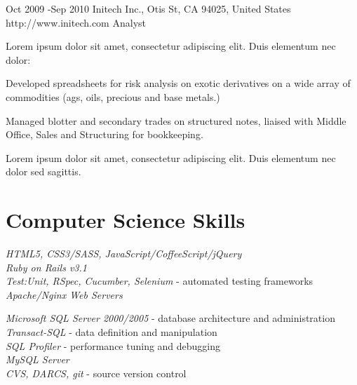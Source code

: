 \documentclass[10pt]{article} %
\begin{document}
\job
{Oct 2009 -}{Sep 2010}
{Initech Inc., Otis St, CA 94025, United States}
{http://www.initech.com}
{Analyst}
{Lorem ipsum dolor sit amet, consectetur adipiscing elit. Duis elementum nec dolor:

\begin{itemize-noindent}
\item{Developed spreadsheets for risk analysis on exotic derivatives on a wide array of commodities (ags, oils, precious and base metals.)}
\item{Managed blotter and secondary trades on structured notes, liaised with Middle Office, Sales and Structuring for bookkeeping.}
\end{itemize-noindent}

Lorem ipsum dolor sit amet, consectetur adipiscing elit. Duis elementum nec dolor sed sagittis.}


\section{Computer Science Skills}



{
\textit{HTML5, CSS3/SASS, JavaScript/CoffeeScript/jQuery}\\
\textit{Ruby on Rails v3.1}\\
\textit{Test:Unit, RSpec, Cucumber, Selenium} - automated testing frameworks\\
\textit{Apache/Nginx Web Servers}\\
}


{
\textit{Microsoft SQL Server 2000/2005} - database architecture and administration\\
\textit{Transact-SQL} - data definition and manipulation\\
\textit{SQL Profiler} - performance tuning and debugging\\
\textit{MySQL Server}\\
\textit{CVS, DARCS, git} - source version control
}
\end{document}
